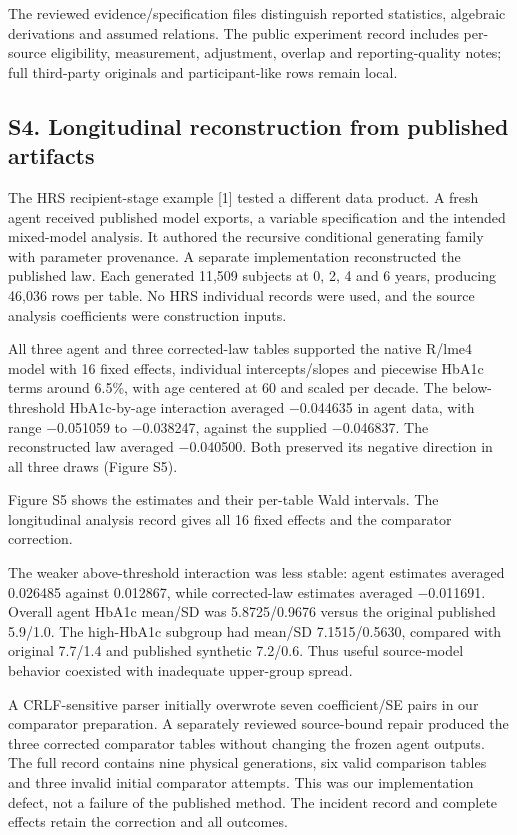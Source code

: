 \documentclass[11pt,letterpaper]{article}
\begin{document}
\endgroup

The reviewed evidence/\allowbreak{}specification files distinguish reported statistics, algebraic derivations and assumed relations. The public experiment record includes per-source eligibility, measurement, adjustment, overlap and reporting-quality notes; full third-party originals and participant-like rows remain local.


\subsection*{S4. Longitudinal reconstruction from published artifacts}

The HRS recipient-stage example [1] tested a different data product. A fresh agent received published model exports, a variable specification and the intended mixed-model analysis. It authored the recursive conditional generating family with parameter provenance. A separate implementation reconstructed the published law. Each generated 11,509 subjects at 0, 2, 4 and 6 years, producing 46,036 rows per table. No HRS individual records were used, and the source analysis coefficients were construction inputs.


All three agent and three corrected-law tables supported the native R/\allowbreak{}lme4 model with 16 fixed effects, individual intercepts/\allowbreak{}slopes and piecewise HbA1c terms around 6.5\%, with age centered at 60 and scaled per decade. The below-threshold HbA1c-by-age interaction averaged −0.044635 in agent data, with range −0.051059 to −0.038247, against the supplied −0.046837. The reconstructed law averaged −0.040500. Both preserved its negative direction in all three draws (Figure S5).


Figure S5 shows the estimates and their per-table Wald intervals. The longitudinal analysis record gives all 16 fixed effects and the comparator correction.


The weaker above-threshold interaction was less stable: agent estimates averaged 0.026485 against 0.012867, while corrected-law estimates averaged −0.011691. Overall agent HbA1c mean/\allowbreak{}SD was 5.8725/\allowbreak{}0.9676 versus the original published 5.9/\allowbreak{}1.0. The high-HbA1c subgroup had mean/\allowbreak{}SD 7.1515/\allowbreak{}0.5630, compared with original 7.7/\allowbreak{}1.4 and published synthetic 7.2/\allowbreak{}0.6. Thus useful source-model behavior coexisted with inadequate upper-group spread.


A CRLF-sensitive parser initially overwrote seven coefficient/\allowbreak{}SE pairs in our comparator preparation. A separately reviewed source-bound repair produced the three corrected comparator tables without changing the frozen agent outputs. The full record contains nine physical generations, six valid comparison tables and three invalid initial comparator attempts. This was our implementation defect, not a failure of the published method. The incident record and complete effects retain the correction and all outcomes.
\end{document}
